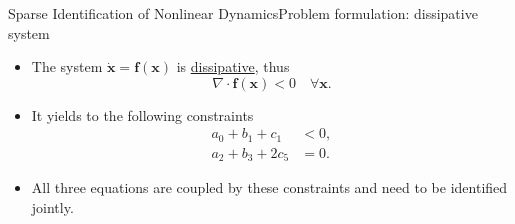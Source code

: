 \begin{frame}[t, c]{Sparse Identification of Nonlinear Dynamics}{Problem formulation: dissipative system}
  \begin{minipage}{.28\textwidth}
    \centering
  \end{minipage}%
  \hfill
  \begin{minipage}{.68\textwidth}
    \begin{itemize}
    \item The system \( \dot{\bm{x}} = \bm{f}(\bm{x}) \) is \underline{dissipative}, thus
      \[
        \nabla \cdot \bm{f}(\bm{x}) < 0 \quad \forall \bm{x}.
      \]
      
      \medskip
      
    \item It yields to the following constraints
      \[
        \begin{aligned}
          a_0 + b_1 + c_1 & < 0, \\
          a_2 + b_3 + 2c_5 & = 0.
        \end{aligned}
      \]
      
      \medskip
      
    \item All three equations are coupled by these constraints and need to be identified jointly.
    \end{itemize}
  \end{minipage}
  
  \vspace{1cm}
\end{frame}

